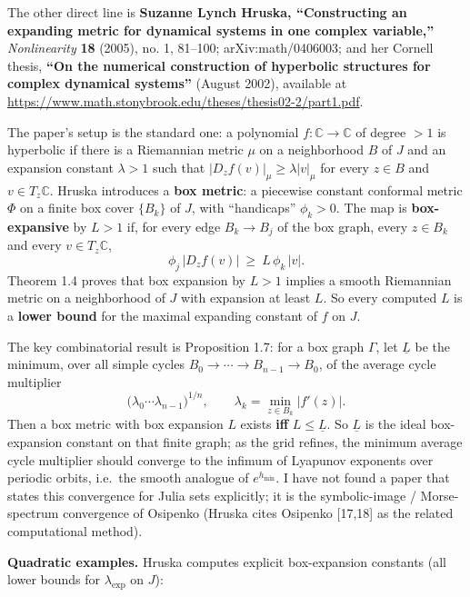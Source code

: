 \documentclass[
]{article}
\begin{document}
The other direct line is \textbf{Suzanne Lynch Hruska, ``Constructing an
expanding metric for dynamical systems in one complex variable,''}
\emph{Nonlinearity} \textbf{18} (2005), no. 1, 81--100;
arXiv:math/0406003; and her Cornell thesis, \textbf{``On the numerical
construction of hyperbolic structures for complex dynamical systems''}
(August 2002), available at
\url{https://www.math.stonybrook.edu/theses/thesis02-2/part1.pdf}.

The paper's setup is the standard one: a polynomial
\(f:\mathbb C\to\mathbb C\) of degree \(>1\) is hyperbolic if there is a
Riemannian metric \(\mu\) on a neighborhood \(B\) of \(J\) and an
expansion constant \(\lambda>1\) such that
\(|D_zf(v)|_\mu\ge\lambda|v|_\mu\) for every \(z\in B\) and
\(v\in T_z\mathbb C\). Hruska introduces a \textbf{box metric}: a
piecewise constant conformal metric \(\Phi\) on a finite box cover
\(\{B_k\}\) of \(J\), with ``handicaps'' \(\phi_k>0\). The map is
\textbf{box-expansive} by \(L>1\) if, for every edge \(B_k\to B_j\) of
the box graph, every \(z\in B_k\) and every \(v\in T_z\mathbb C\), \[
\phi_j\,|D_zf(v)|\ \ge\ L\,\phi_k\,|v|.
\] Theorem 1.4 proves that box expansion by \(L>1\) implies a smooth
Riemannian metric on a neighborhood of \(J\) with expansion at least
\(L\). So every computed \(L\) is a \textbf{lower bound} for the maximal
expanding constant of \(f\) on \(J\).

The key combinatorial result is Proposition 1.7: for a box graph
\(\Gamma\), let \(\underline L\) be the minimum, over all simple cycles
\(B_0\to\cdots\to B_{n-1}\to B_0\), of the average cycle multiplier \[
\bigl(\lambda_0\cdots\lambda_{n-1}\bigr)^{1/n},\qquad
\lambda_k=\min_{z\in B_k}|f'(z)|.
\] Then a box metric with box expansion \(L\) exists \textbf{iff}
\(L\le\underline L\). So \(\underline L\) is the ideal box-expansion
constant on that finite graph; as the grid refines, the minimum average
cycle multiplier should converge to the infimum of Lyapunov exponents
over periodic orbits, i.e.~the smooth analogue of \(e^{h_{\min}}\). I
have not found a paper that states this convergence for Julia sets
explicitly; it is the symbolic-image / Morse-spectrum convergence of
Osipenko (Hruska cites Osipenko {[}17,18{]} as the related computational
method).

\textbf{Quadratic examples.} Hruska computes explicit box-expansion
constants (all lower bounds for \(\lambda_{\exp}\) on \(J\)):
\end{document}
